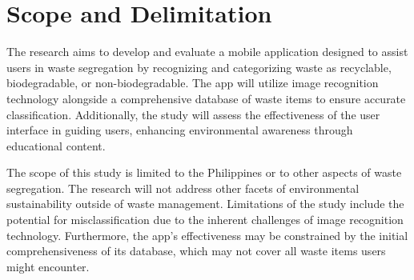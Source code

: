 \section{Scope and Delimitation}
	The research aims to develop and evaluate a mobile application designed to assist users in waste segregation by recognizing and categorizing waste as recyclable, biodegradable, or non-biodegradable. The app will utilize image recognition technology alongside a comprehensive database of waste items to ensure accurate classification. Additionally, the study will assess the effectiveness of the user interface in guiding users, enhancing environmental awareness through educational content.
	
	The scope of this study is limited to the Philippines or to other aspects of waste segregation. The research will not address other facets of environmental sustainability outside of waste management. Limitations of the study include the potential for misclassification due to the inherent challenges of image recognition technology. Furthermore, the app's effectiveness may be constrained by the initial comprehensiveness of its database, which may not cover all waste items users might encounter.